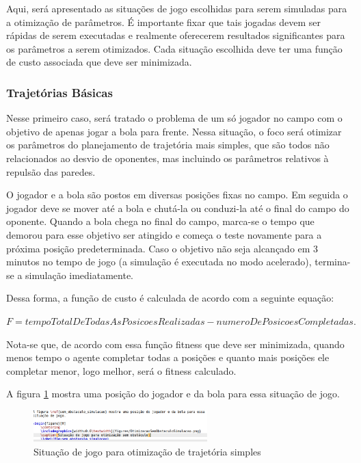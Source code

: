 \documentclass[a4paper,12pt]{article}
\begin{document}
Aqui, será apresentado as situações de jogo escolhidas para serem simuladas para a otimização de parâmetros. É importante fixar que tais jogadas devem ser rápidas de serem executadas e realmente oferecerem resultados significantes para os parâmetros a serem otimizados. Cada situação escolhida deve ter uma função de custo associada que deve ser minimizada.


\subsubsection{Trajetórias Básicas}

Nesse primeiro caso, será tratado o problema de um só jogador no campo com o objetivo de apenas jogar a bola para frente. Nessa situação, o foco será otimizar os parâmetros do planejamento de trajetória mais simples, que são todos não relacionados ao desvio de oponentes, mas incluindo os parâmetros relativos à repulsão das paredes.

O jogador e a bola são postos em diversas posições fixas no campo. Em seguida o jogador deve se mover até a bola e chutá-la ou conduzi-la até o final do campo do oponente. Quando a bola chega no final do campo, marca-se o tempo que demorou para esse objetivo ser atingido e começa o teste novamente para a próxima posição predeterminada. Caso o objetivo não seja alcançado em 3 minutos no tempo de jogo (a simulação é executada no modo acelerado), termina-se a simulação imediatamente.

Dessa forma, a função de custo é calculada de acordo com a seguinte equação:

$ F = tempoTotalDeTodasAsPosicoesRealizadas - numeroDePosicoesCompletadas. $
 
Nota-se que, de acordo com essa função fitness que deve ser minimizada, quando menos tempo o agente completar todas a posições e quanto mais posições ele completar menor, logo melhor, será o fitness calculado.

A figura \ref{fig:sem_obstaculo_simulacao} mostra uma posição do jogador e da bola para essa situação de jogo.

\begin{figure}[H]
	\centering
	\includegraphics[width=0.6\textwidth]{figures/OtimizacaoSemObstaculoSimulacao.png}
	\caption{Situação de jogo para otimização de trajetória simples}
	\label{fig:sem_obstaculo_simulacao}
\end{figure}
\end{document}
